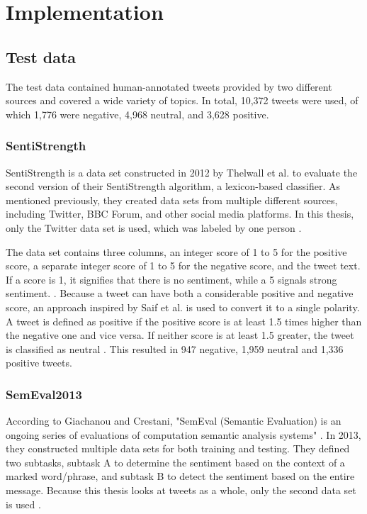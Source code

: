 \chapter{Implementation}
\label{cha:Chapter5_Implementation}
\section{Test data}
The test data contained human-annotated tweets provided by two different sources and covered a wide variety of topics. In total, 10,372 tweets were used, of which 1,776 were negative, 4,968 neutral, and 3,628 positive.

\subsection{SentiStrength}
SentiStrength is a data set constructed in 2012 by Thelwall et al. to evaluate the second version of their SentiStrength algorithm, a lexicon-based classifier. As mentioned previously, they created data sets from multiple different sources, including Twitter, BBC Forum, and other social media platforms. In this thesis, only the Twitter data set is used, which was labeled by one person \cite{10.1002/asi.21662}.

The data set contains three columns, an integer score of 1 to 5 for the positive score, a separate integer score of 1 to 5 for the negative score, and the tweet text. If a score is 1, it signifies that there is no sentiment, while a 5 signals strong sentiment. \cite{10.1002/asi.21662}. Because a tweet can have both a considerable positive and negative score, an approach inspired by Saif et al. is used to convert it to a single polarity. A tweet is defined as positive if the positive score is at least 1.5 times higher than the negative one and vice versa. If neither score is at least 1.5 greater, the tweet is classified as neutral \cite{oro40660}. This resulted in 947 negative, 1,959 neutral and 1,336 positive tweets.

\subsection{SemEval2013}
According to Giachanou and Crestani, "SemEval (Semantic Evaluation) is an ongoing series of evaluations of computation semantic analysis systems" \cite[p.~28:31]{DBLP:journals/csur/GiachanouC16}. In 2013, they constructed multiple data sets for both training and testing. They defined two subtasks, subtask A to determine the sentiment based on the context of a marked word/phrase, and subtask B to detect the sentiment based on the entire message. Because this thesis looks at tweets as a whole, only the second data set is used \cite{nakov-etal-2013-semeval}.

